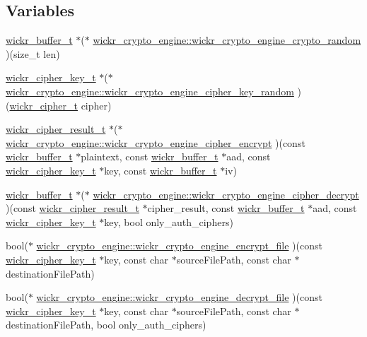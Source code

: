 \subsection*{Variables}
\begin{DoxyCompactItemize}
\item 
\hyperlink{structwickr__buffer}{wickr\+\_\+buffer\+\_\+t} $\ast$($\ast$ \hyperlink{group__wickr__crypto__engine_gae12855853c05caa473e748a62611d307}{wickr\+\_\+crypto\+\_\+engine\+::wickr\+\_\+crypto\+\_\+engine\+\_\+crypto\+\_\+random} )(size\+\_\+t len)
\item 
\hyperlink{structwickr__cipher__key}{wickr\+\_\+cipher\+\_\+key\+\_\+t} $\ast$($\ast$ \hyperlink{group__wickr__crypto__engine_gabc120effc5248a491b18138f9b74b526}{wickr\+\_\+crypto\+\_\+engine\+::wickr\+\_\+crypto\+\_\+engine\+\_\+cipher\+\_\+key\+\_\+random} )(\hyperlink{structwickr__cipher}{wickr\+\_\+cipher\+\_\+t} cipher)
\item 
\hyperlink{structwickr__cipher__result}{wickr\+\_\+cipher\+\_\+result\+\_\+t} $\ast$($\ast$ \hyperlink{group__wickr__crypto__engine_gaf7be0d0ca0d9e7a0c5c3b1ec0fd0918e}{wickr\+\_\+crypto\+\_\+engine\+::wickr\+\_\+crypto\+\_\+engine\+\_\+cipher\+\_\+encrypt} )(const \hyperlink{structwickr__buffer}{wickr\+\_\+buffer\+\_\+t} $\ast$plaintext, const \hyperlink{structwickr__buffer}{wickr\+\_\+buffer\+\_\+t} $\ast$aad, const \hyperlink{structwickr__cipher__key}{wickr\+\_\+cipher\+\_\+key\+\_\+t} $\ast$key, const \hyperlink{structwickr__buffer}{wickr\+\_\+buffer\+\_\+t} $\ast$iv)
\item 
\hyperlink{structwickr__buffer}{wickr\+\_\+buffer\+\_\+t} $\ast$($\ast$ \hyperlink{group__wickr__crypto__engine_ga459ef821cc40edb5e3c9ce1d571ddc00}{wickr\+\_\+crypto\+\_\+engine\+::wickr\+\_\+crypto\+\_\+engine\+\_\+cipher\+\_\+decrypt} )(const \hyperlink{structwickr__cipher__result}{wickr\+\_\+cipher\+\_\+result\+\_\+t} $\ast$cipher\+\_\+result, const \hyperlink{structwickr__buffer}{wickr\+\_\+buffer\+\_\+t} $\ast$aad, const \hyperlink{structwickr__cipher__key}{wickr\+\_\+cipher\+\_\+key\+\_\+t} $\ast$key, bool only\+\_\+auth\+\_\+ciphers)
\item 
bool($\ast$ \hyperlink{group__wickr__crypto__engine_gaa77b1bc373d92d9db9d801bcc4a4d29c}{wickr\+\_\+crypto\+\_\+engine\+::wickr\+\_\+crypto\+\_\+engine\+\_\+encrypt\+\_\+file} )(const \hyperlink{structwickr__cipher__key}{wickr\+\_\+cipher\+\_\+key\+\_\+t} $\ast$key, const char $\ast$source\+File\+Path, const char $\ast$destination\+File\+Path)
\item 
bool($\ast$ \hyperlink{group__wickr__crypto__engine_ga361b843efc839e30f90ce24c15b1dd27}{wickr\+\_\+crypto\+\_\+engine\+::wickr\+\_\+crypto\+\_\+engine\+\_\+decrypt\+\_\+file} )(const \hyperlink{structwickr__cipher__key}{wickr\+\_\+cipher\+\_\+key\+\_\+t} $\ast$key, const char $\ast$source\+File\+Path, const char $\ast$destination\+File\+Path, bool only\+\_\+auth\+\_\+ciphers)

\end{DoxyCompactItemize}
